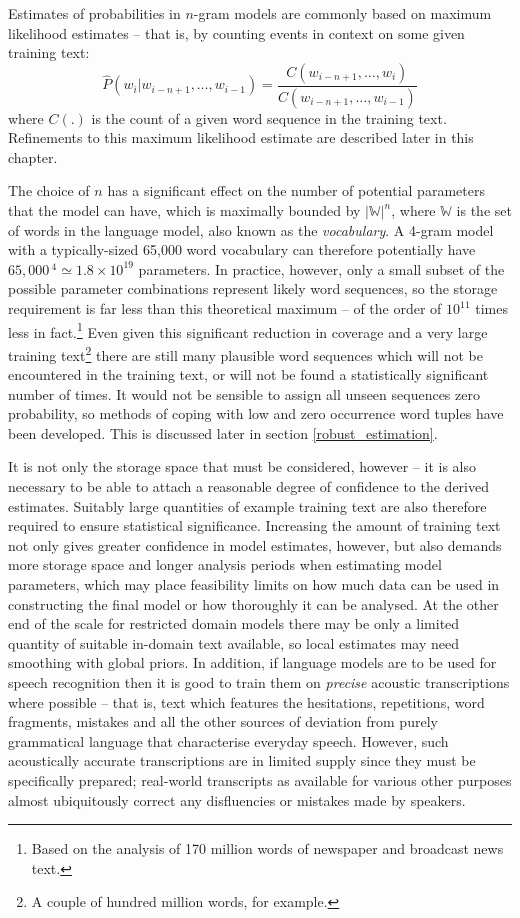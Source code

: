 Estimates of probabilities in $n$-gram models are commonly based on maximum
likelihood estimates -- that is, by counting events in context on some given
training text:
\begin{equation}
\hat P(w_i | w_{i-n+1}, \ldots, w_{i-1}) =
\frac{C(w_{i-n+1}, \ldots, w_i)}{C(w_{i-n+1}, \ldots, w_{i-1})}\label{ngramcountdiv}
\end{equation}
where $C(.)$ is the count of a given word sequence in the
training text. Refinements to this maximum likelihood estimate are
described later in this chapter.

The choice of $n$ has a significant effect on the number of potential
parameters that the model can have, which is maximally bounded by
$|\mathbb{W}|^n$, where $\mathbb{W}$ is the set of words in the
language model, also known as the {\it vocabulary}.  A 4-gram model
with a typically-sized 65,000 word vocabulary can therefore
potentially have $65,000\,^4
\simeq 1.8\times10^{19}$ parameters.  In practice, however, only a
small subset of the possible parameter combinations represent likely
word sequences, so the storage requirement is far less than this
theoretical maximum -- of the order of $10^{11}$ times less in
fact.\footnote{Based on the analysis of 170 million words of newspaper
and broadcast news text.}  Even given this significant reduction in
coverage and a very large training text\footnote{A couple of hundred
million words, for example.} there are still many plausible word
sequences which will not be encountered in the training text, or will
not be found a statistically significant number of times. It would not
be sensible to assign all unseen sequences zero probability, so
methods of coping with low and zero occurrence word tuples have been
developed. This is discussed later in section \ref{robust_estimation}.

It is not only the storage space that must be considered, however --
it is also necessary to be able to attach a reasonable degree of
confidence to the derived estimates. Suitably large quantities of
example training text are also therefore required to ensure statistical
significance.  Increasing the amount of training text not only gives
greater confidence in model estimates, however, but also demands more
storage space and longer analysis periods when estimating model
parameters, which may place feasibility limits on how much data can be
used in constructing the final model or how thoroughly it can be
analysed. At the other end of the scale for restricted domain models
there may be only a limited quantity of suitable in-domain text
available, so local estimates may need smoothing with global priors.
In addition, if language models are to be used for speech recognition
then it is good to train them on {\it precise} acoustic transcriptions
where possible -- that is, text which features the hesitations,
repetitions, word fragments, mistakes and all the other sources of
deviation from purely grammatical language that characterise everyday
speech. However, such acoustically accurate transcriptions are in
limited supply since they must be specifically prepared; real-world
transcripts as available for various other purposes almost
ubiquitously correct any disfluencies or mistakes made by speakers.


